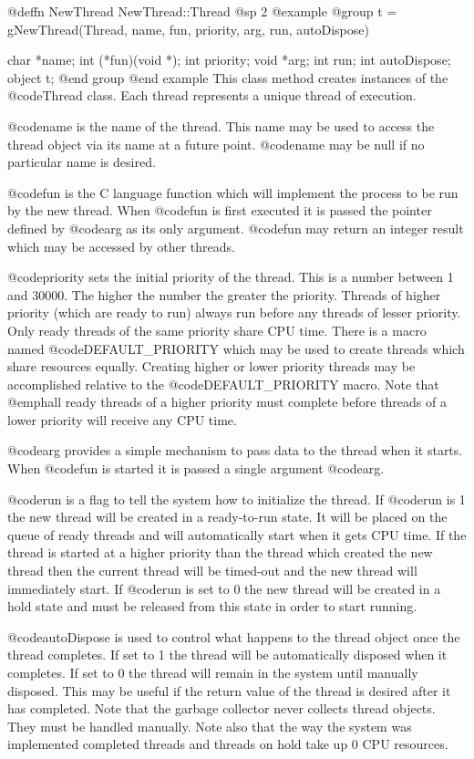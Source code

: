 @deffn {NewThread} NewThread::Thread
@sp 2
@example
@group
t = gNewThread(Thread, name, fun, priority, arg, run,
               autoDispose)

char    *name;
int     (*fun)(void *);
int     priority;
void    *arg;
int     run;
int     autoDispose;
object  t;
@end group
@end example
This class method creates instances of the @code{Thread} class.  Each
thread represents a unique thread of execution.

@code{name} is the name of the thread.  This name may be used to access
the thread object via its name at a future point.  @code{name} may
be null if no particular name is desired.

@code{fun} is the C language function which will implement the process
to be run by the new thread.  When @code{fun} is first executed it is
passed the pointer defined by @code{arg} as its only argument.  @code{fun}
may return an integer result which may be accessed by other threads.

@code{priority} sets the initial priority of the thread.  This is a number
between 1 and 30000.  The higher the number the greater the priority.
Threads of higher priority (which are ready to run) always run before
any threads of lesser priority.  Only ready threads of the same priority
share CPU time.  There is a macro named @code{DEFAULT_PRIORITY} which
may be used to create threads which share resources equally.  Creating
higher or lower priority threads may be accomplished relative to the
@code{DEFAULT_PRIORITY} macro.  Note that @emph{all} ready threads of
a higher priority must complete before threads of a lower priority will
receive any CPU time.

@code{arg} provides a simple mechanism to pass data to the thread when
it starts.  When @code{fun} is started it is passed a single argument
@code{arg}.

@code{run} is a flag to tell the system how to initialize the thread.
If @code{run} is 1 the new thread will be created in a ready-to-run
state.  It will be placed on the queue of ready threads and will
automatically start when it gets CPU time.  If the thread is started
at a higher priority than the thread which created the new thread
then the current thread will be timed-out and the new thread will
immediately start.  If @code{run} is set to 0 the new thread will
be created in a hold state and must be released from this state
in order to start running.

@code{autoDispose} is used to control what happens to the thread
object once the thread completes.  If set to 1 the thread will be
automatically disposed when it completes.  If set to 0 the thread
will remain in the system until manually disposed.  This may
be useful if the return value of the thread is desired after it
has completed.  Note that the garbage collector never collects
thread objects.  They must be handled manually.  Note also that
the way the system was implemented completed threads and threads
on hold take up 0 CPU resources.

